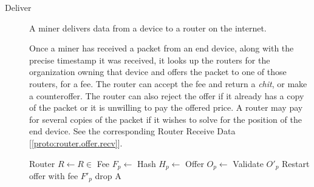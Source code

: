 \documentclass[UTF8, 10pt, nonatbib, nocopyrightspace, reprint]{sigplanconf}
\newenvironment{protocol}[2]{
  \begin{algorithm}[!htb]
    \DontPrintSemicolon
    \caption{#1}\label{#2}
}{
  \end{algorithm}
  \FloatBarrier
}
\newcommand{\protoref}[1]{[\autoref{#1}]}
\begin{document}
\begin{description}
    \begin{protocol}{Miner Receive Serialization Challenge}{proto:miner.recv.challenge.serialization}

    \end{protocol}


  \item [Deliver] A miner delivers data from a device to a router on the internet.

    Once a miner has received a packet from an end device, along with the precise timestamp it was received, it looks up the routers for the organization owning that device and offers the packet to one of those routers, for a fee. The router can accept the fee and return a \emph{chit}, or make a counteroffer. The router can also reject the offer if it already has a copy of the packet or it is unwilling to pay the offered price. A router may pay for several copies of the packet if it wishes to solve for the position of the end device. See the corresponding Router Receive Data \protoref{proto:router.offer.recv}.

    \begin{protocol}{Miner Deliver Device Data}{proto:miner.data.deliver}

       {
        Router $R \leftarrow R \in $  \;
        Fee $F_p \leftarrow $  \;
        Hash $H_p \leftarrow $  \;
        Offer $O_p \leftarrow $  \;
         {
           {
            Validate ${O\prime}_p$\;
             {
               {
                Restart offer with fee ${F\prime}_p$\;
              }
               {
                drop A
              }
            }
          }
        }
      }
    \end{protocol}




\end{description}
\end{document}
